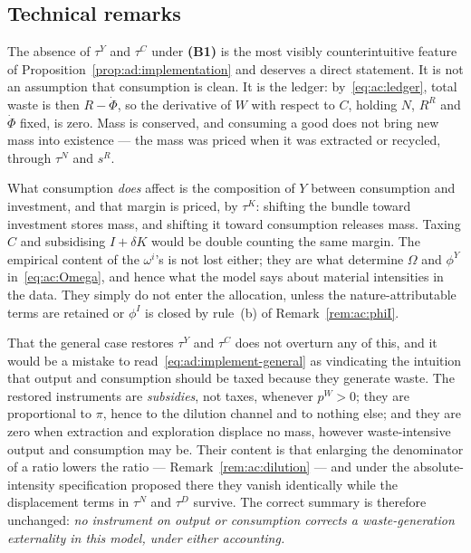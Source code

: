\subsection{Technical remarks}
\label{subsec:ad:remarks}

\begin{remark}\label{rem:ad:no-tauY}
The absence of $\tau^Y$ and $\tau^C$ under \textbf{(B1)} is the most visibly counterintuitive feature of Proposition~\ref{prop:ad:implementation} and deserves a direct statement. It is not an assumption that consumption is clean. It is the ledger: by~\eqref{eq:ac:ledger}, total waste is then $R-\dot\Phi$, so the derivative of $W$ with respect to $C$, holding $N$, $R^R$ and $\dot\Phi$ fixed, is zero. Mass is conserved, and consuming a good does not bring new mass into existence --- the mass was priced when it was extracted or recycled, through $\tau^N$ and $s^R$.

What consumption \emph{does} affect is the composition of $Y$ between consumption and investment, and that margin is priced, by $\tau^K$: shifting the bundle toward investment stores mass, and shifting it toward consumption releases mass. Taxing $C$ and subsidising $I+\delta K$ would be double counting the same margin. The empirical content of the $\omega^i$'s is not lost either; they are what determine $\Omega$ and $\phi^Y$ in~\eqref{eq:ac:Omega}, and hence what the model says about material intensities in the data. They simply do not enter the allocation, unless the nature-attributable terms are retained or $\phi^I$ is closed by rule~(b) of Remark~\ref{rem:ac:phiI}.

That the general case restores $\tau^Y$ and $\tau^C$ does not overturn any of this, and it would be a mistake to read~\eqref{eq:ad:implement-general} as vindicating the intuition that output and consumption should be taxed because they generate waste. The restored instruments are \emph{subsidies}, not taxes, whenever $p^W>0$; they are proportional to $\pi$, hence to the dilution channel and to nothing else; and they are zero when extraction and exploration displace no mass, however waste-intensive output and consumption may be. Their content is that enlarging the denominator of a ratio lowers the ratio --- Remark~\ref{rem:ac:dilution} --- and under the absolute-intensity specification proposed there they vanish identically while the displacement terms in $\tau^N$ and $\tau^D$ survive. The correct summary is therefore unchanged: \emph{no instrument on output or consumption corrects a waste-generation externality in this model, under either accounting.}
\end{remark}

